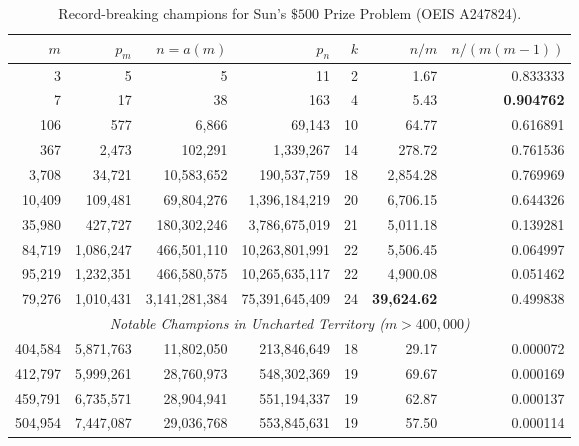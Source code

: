 \documentclass[11pt,a4paper]{article}
\theoremstyle{definition}
\theoremstyle{remark}
\begin{document}
\begin{table}[htbp]
\centering
\small
\caption{Record-breaking champions for Sun's $\$500$ Prize Problem (OEIS A247824).}
\label{tab:a247824}
\begin{tabular}{rrrrrrr}
\toprule
$m$ & $p_m$ & $n = a(m)$ & $p_n$ & $k$ & $n / m$ & $n / (m(m-1))$ \\
\midrule
3       & 5         & 5          & 11          & 2  & 1.67   & 0.833333 \\
7       & 17        & 38         & 163         & 4  & 5.43   & \textbf{0.904762} \\
106     & 577       & 6,866      & 69,143      & 10 & 64.77  & 0.616891 \\
367     & 2,473     & 102,291    & 1,339,267   & 14 & 278.72 & 0.761536 \\
3,708   & 34,721    & 10,583,652 & 190,537,759 & 18 & 2,854.28 & 0.769969 \\
10,409  & 109,481   & 69,804,276 & 1,396,184,219 & 20 & 6,706.15 & 0.644326 \\
35,980  & 427,727   & 180,302,246 & 3,786,675,019 & 21 & 5,011.18 & 0.139281 \\
84,719  & 1,086,247 & 466,501,110 & 10,263,801,991 & 22 & 5,506.45 & 0.064997 \\
95,219  & 1,232,351 & 466,580,575 & 10,265,635,117 & 22 & 4,900.08 & 0.051462 \\
79,276  & 1,010,431 & 3,141,281,384 & 75,391,645,409 & 24 & \textbf{39,624.62} & 0.499838 \\
\midrule
\multicolumn{7}{c}{\textit{Notable Champions in Uncharted Territory ($m > 400,000$)}} \\
\midrule
404,584 & 5,871,763 & 11,802,050 & 213,846,649 & 18 & 29.17  & 0.000072 \\
412,797 & 5,999,261 & 28,760,973 & 548,302,369 & 19 & 69.67  & 0.000169 \\
459,791 & 6,735,571 & 28,904,941 & 551,194,337 & 19 & 62.87  & 0.000137 \\
504,954 & 7,447,087 & 29,036,768 & 553,845,631 & 19 & 57.50  & 0.000114 \\
\bottomrule
\end{tabular}
\end{table}
\end{document}
